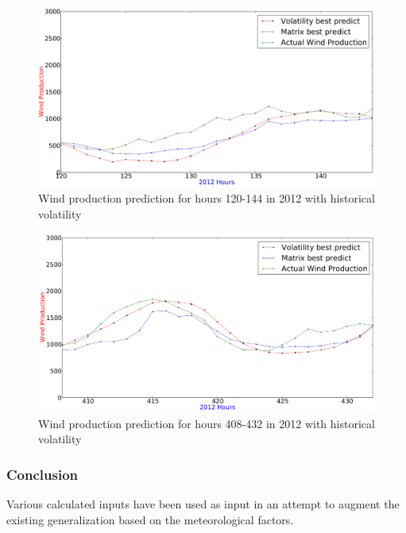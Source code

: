 \begin{figure}[H]
\centering
\includegraphics[width=0.99\linewidth]{billeder/bestVolatility120to144.png}
\caption{Wind production prediction for hours 120-144 in 2012 with historical volatility}
\label{fig:bestVolatility120to144}
\end{figure} 

\begin{figure}[H]
\centering
\includegraphics[width=0.99\linewidth]{billeder/bestVolatility408to432.png}
\caption{Wind production prediction for hours 408-432 in 2012 with historical volatility}
\label{fig:bestVolatility408to432}
\end{figure} 

\subsubsection{Conclusion}
Various calculated inputs have been used as input in an attempt to augment the existing generalization based on the meteorological factors. 

